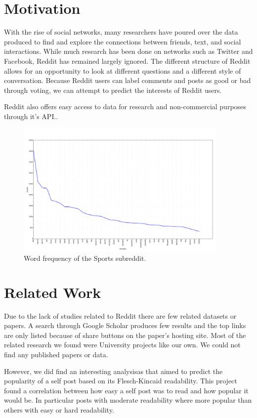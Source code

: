 \documentclass[10pt,twocolumn]{article}
\begin{document}
\section{Motivation}
With the rise of social networks, many researchers have poured over the data produced to find and explore the connections between friends, text, and social interactions. While much research has been done on networks such as Twitter and Facebook, Reddit has remained largely ignored. The different structure of Reddit allows for an opportunity to look at different questions and a different style of conversation. Because Reddit users can label comments and posts as good or bad through voting, we can attempt to predict the interests of Reddit users.

Reddit also offers easy access to data for research and non-commercial purposes through it's API.\cite{reddit}. 

\begin{figure}
    \centering
  	\includegraphics[width=0.92\textwidth]{./sports_freq.png}
  	\caption{Word frequency of the Sports subreddit.}
  	\label{sports}
\end{figure}

\section{Related Work}

Due to the lack of studies related to Reddit there are few related datasets or papers. A search through Google Scholar produces few results and the top links are only listed because of share buttons on the paper's hosting site. Most of the related research we found were University projects like our own. We could not find any published papers or data.

However, we did find an interesting analysis\cite{bcjordan}as that aimed to predict the popularity of a self post based on its Flesch-Kincaid\cite{flesch1949art} readability. This project found a correlation between how easy a self post was to read and how popular it would be. In particular posts with moderate readability where more popular than others with easy or hard readability.
\end{document}
